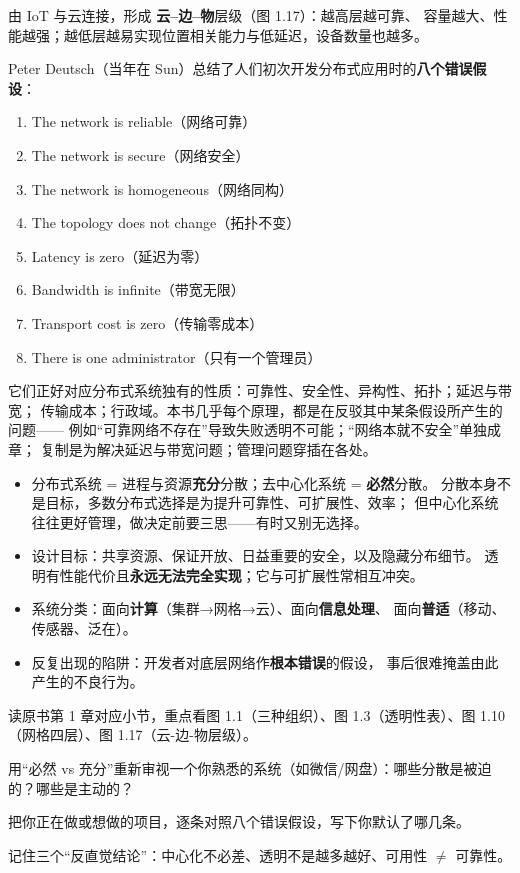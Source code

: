 \noindent 由 IoT 与云连接，形成 \textbf{云–边–物}层级（图 1.17）：越高层越可靠、
容量越大、性能越强；越低层越易实现位置相关能力与低延迟，设备数量也越多。



Peter Deutsch（当年在 Sun）总结了人们初次开发分布式应用时的\textbf{八个错误假设}：

\begin{enumerate}[leftmargin=1.6em]
  \item The network is reliable（网络可靠）
  \item The network is secure（网络安全）
  \item The network is homogeneous（网络同构）
  \item The topology does not change（拓扑不变）
  \item Latency is zero（延迟为零）
  \item Bandwidth is infinite（带宽无限）
  \item Transport cost is zero（传输零成本）
  \item There is one administrator（只有一个管理员）
\end{enumerate}

\begin{ideabox}[为什么这八条是全书索引]
它们正好对应分布式系统独有的性质：可靠性、安全性、异构性、拓扑；延迟与带宽；
传输成本；行政域。本书几乎每个原理，都是在反驳其中某条假设所产生的问题——
例如“可靠网络不存在”导致失败透明不可能；“网络本就不安全”单独成章；
复制是为解决延迟与带宽问题；管理问题穿插在各处。
\end{ideabox}



\begin{itemize}
  \item 分布式系统 = 进程与资源\textbf{充分}分散；去中心化系统 = \textbf{必然}分散。
        分散本身不是目标，多数分布式选择是为提升可靠性、可扩展性、效率；
        但中心化系统往往更好管理，做决定前要三思——有时又别无选择。
  \item 设计目标：共享资源、保证开放、日益重要的安全，以及隐藏分布细节。
        透明有性能代价且\textbf{永远无法完全实现}；它与可扩展性常相互冲突。
  \item 系统分类：面向\textbf{计算}（集群→网格→云）、面向\textbf{信息处理}、
        面向\textbf{普适}（移动、传感器、泛在）。
  \item 反复出现的陷阱：开发者对底层网络作\textbf{根本错误}的假设，
        事后很难掩盖由此产生的不良行为。
\end{itemize}


\begin{actions}
  \item 读原书第 1 章对应小节，重点看图 1.1（三种组织）、图 1.3（透明性表）、图 1.10（网格四层）、图 1.17（云-边-物层级）。
  \item 用“必然 vs 充分”重新审视一个你熟悉的系统（如微信/网盘）：哪些分散是被迫的？哪些是主动的？
  \item 把你正在做或想做的项目，逐条对照八个错误假设，写下你默认了哪几条。
  \item 记住三个“反直觉结论”：中心化不必差、透明不是越多越好、可用性 $\neq$ 可靠性。
\end{actions}
